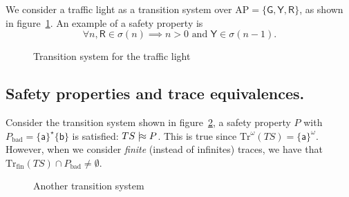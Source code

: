 \documentclass[./main]{subfiles}
\begin{document}
  \begin{en-exm}
    We consider a traffic light as a transition system over $\mathrm{AP} = \{\mathsf{G}, \mathsf{Y}, \mathsf{R}\}$, as shown in figure~\ref{fig:traffic-light}.
    An example of a safety property is
    \[
    \forall n, \mathsf{R} \in \sigma(n) \implies n > 0 \text{ and } \mathsf{Y} \in \sigma(n-1)
    .\] 
  \end{en-exm}

  \begin{figure}[b]
    \centering
    \caption{Transition system for the traffic light}
    \label{fig:traffic-light}
  \end{figure}

  \subsection{Safety properties and trace equivalences.}

  \begin{en-exm}
    \label{exm:two-states-ts}
    Consider the transition system shown in figure~\ref{fig:two-states-ts}, a safety property $P$ with $P_\mathrm{bad} = \{\mathsf{a}\}^\star \{\mathsf{b}\}$ is satisfied: $TS \mathrel{{|}\!{\approx}} P$. 
    This is true since $\mathrm{Tr}^\omega(TS) = \{\mathsf{a}\}^\omega$.
    However, when we consider \textit{finite} (instead of infinites) traces, we have that $\mathrm{Tr}_\mathrm{fin}(TS) \cap P_\mathrm{bad} \neq \emptyset$.
  \end{en-exm}

  \begin{figure}
    \centering
    \caption{Another transition system}
    \label{fig:two-states-ts}
  \end{figure}
\end{document}
